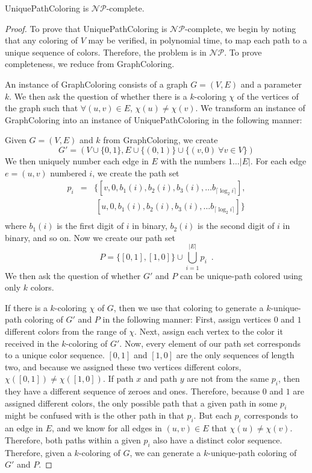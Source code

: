 \documentclass[runningheads]{llncs}
\newcommand{\NP}{\ensuremath{\mathcal{NP}}}
\begin{document}
\begin{theorem}{\sc UniquePathColoring} is \NP-complete.\end{theorem}
\begin{proof}
To prove that {\sc UniquePathColoring} is \NP-complete, we begin by noting that
any coloring of $V$ may be verified, in polynomial time, to map each path to a
unique sequence of colors.  Therefore, the problem is in \NP.  To prove
completeness, we reduce from {\sc GraphColoring}\cite{gandj}.

An instance of {\sc GraphColoring } consists of a graph $G=(V,E)$ and a
parameter $k$.  We then ask the question of whether there is a $k$-coloring
$\chi$ of the vertices of the graph such that $\forall (u,v)\in E$, $\chi(u)
\neq \chi(v)$.  We transform an instance of {\sc GraphColoring} into an
instance of {\sc UniquePathColoring} in the following manner:

Given $G=(V,E)$ and $k$ from {\sc GraphColoring}, we create $$G'=\left(V \cup
\{0,1\}, E \cup \{(0,1)\} \cup \{ (v, 0)~ \forall v \in V\} \right)$$ We then
uniquely number each edge in $E$ with the numbers $1 \ldots |E|$.  For each
edge $e = (u,v)$ numbered $i$, we create the path set 
\begin{eqnarray*}
p_i &=& \{[v,0,b_1(i),b_2(i), b_3(i), \ldots b_{\lceil \log_2 i\rceil}], \\
    & &  ~[u, 0,b_1(i),b_2(i), b_3(i), \ldots b_{\lceil \log_2 i\rceil}]\} \\
\end{eqnarray*}
where $b_1(i)$ is the first digit of $i$ in binary, $b_2(i)$ is the second
digit of $i$ in binary, and so on.  Now we create our path set $$P = \{ [0,1],
[1,0] \} \cup \bigcup_{i = 1}^{|E|} p_i \enspace .$$ We then ask the question
of whether $G'$ and $P$ can be unique-path colored using only $k$ colors.

If there is a $k$-coloring $\chi$ of $G$, then we use that coloring to generate
a $k$-unique-path coloring of $G'$ and $P$ in the following manner: First,
assign vertices $0$ and $1$ different colors from the range of $\chi$.  Next,
assign each vertex to the color it received in the $k$-coloring of $G'$.  Now,
every element of our path set corresponds to a unique color sequence.  $[0,1]$
and $[1,0]$ are the only sequences of length two, and because we assigned these
two vertices different colors, $\chi([0,1]) \neq \chi([1,0])$.  If path $x$ and
path $y$ are not from the same $p_i$, then they have a different sequence of
zeroes and ones.  Therefore, because $0$ and $1$ are assigned different colors,
the only possible path that a given path in some $p_i$ might be confused with
is the other path in that $p_i$.  But each $p_i$ corresponds to an edge in
$E$, and we know for all edges in $(u,v) \in E$ that $\chi(u) \neq \chi(v)$.
Therefore, both paths within a given $p_i$ also have a distinct color sequence.
Therefore, given a $k$-coloring of $G$, we can generate a $k$-unique-path
coloring of $G'$ and $P$.


\end{proof}
\end{document}
